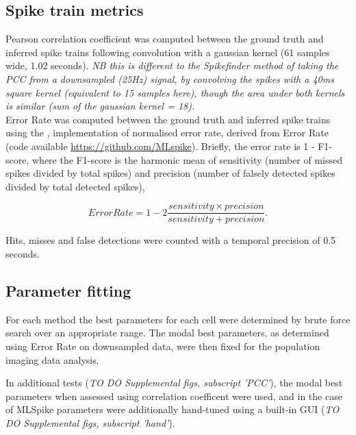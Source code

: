\documentclass[a4paper,10pt,twocolumn]{article}
\begin{document}
\subsection*{Spike train metrics}
Pearson correlation coefficient was computed between the ground truth and inferred spike trains following convolution with a gaussian kernel (61 samples wide, 1.02 seconds). \emph{NB this is different to the Spikefinder method of taking the PCC from a downsampled (25Hz) signal, by convolving the spikes with a 40ms square kernel (equivalent to 15 samples here), though the area under both kernels is similar (sum of the gaussian kernel = 18).}\\
Error Rate was computed between the ground truth and inferred spike trains using the \cite{Deneux2016-gu}, implementation of normalised error rate, derived from \cite{Victor1996-cg} Error Rate (code available \href{https://github.com/MLspike}{https://github.com/MLspike}). Briefly, the error rate is 1 - F1-score, where the F1-score is the harmonic mean of sensitivity (number of missed spikes divided by total spikes) and precision (number of falsely detected spikes divided by total detected spikes),

\[Error Rate = 1 - 2 \frac{sensitivity \times precision}{sensitivity + precision}.\]

Hits, misses and false detections were counted with a temporal precision of 0.5 seconds.

\subsection*{Parameter fitting}
For each method the best parameters for each cell were determined by brute force search over an appropriate range. The modal best parameters, as determined using Error Rate on downsampled data, were then fixed for the population imaging data analysis. 

In additional tests (\emph{TO DO Supplemental figs, subscript 'PCC'}), the modal best parameters when assessed using correlation coefficent were used, and in the case of MLSpike parameters were additionally hand-tuned using a built-in GUI (\emph{TO DO Supplemental figs, subscript 'hand'}). 

\end{document}
